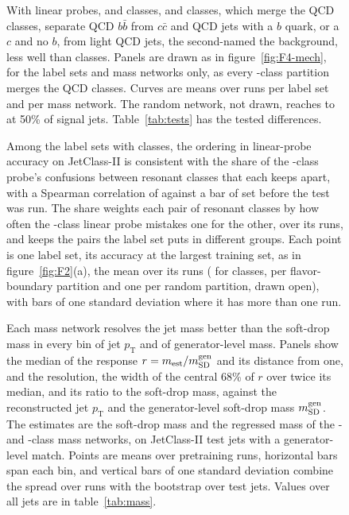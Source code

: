 \begin{figure}[tbp]
\centering
{}
\caption{With linear probes, \Kmid{} and \Kcoarse{} classes, and \Kres{} classes, which merge the QCD classes,
separate QCD $b\bar b$ from $c\bar c$ and QCD jets with a $b$ quark, or a $c$ and no $b$, from light QCD jets, the
second-named the background, less well than \Kfull{} classes. Panels are drawn as in figure~\ref{fig:F4-mech}, for
the label sets and mass networks only, as every \Kcoarse-class partition merges the QCD classes. Curves are means
over \MlstNRunsWord{} runs per label set and \MlstMassNRunsWord{} per mass network. The random network, not drawn,
reaches \MlstPairInitRhalfQcdMin{} to \MlstPairInitRhalfQcdMax{} at 50\% of signal jets. Table~\ref{tab:tests} has
the tested differences.}
\label{fig:F4-qcd}
\end{figure}

\begin{figure}[tbp]
\centering
{}
\caption{Among the \MlstConfShareNWord{} label sets with \Kcoarse{} classes, the ordering in linear-probe accuracy on
JetClass-II is consistent with the share of the \Kfull-class probe's confusions between resonant classes that each
keeps apart, with a Spearman correlation of \MlstConfShareRho{} against a bar of \MlstConfShareBar{} set before the
test was run. The share weights each pair of resonant classes by how often the \Kfull-class linear probe
mistakes one for the other, over its \MlstNRunsWord{} runs, and keeps the pairs the label set
puts in different groups. Each point is one label set, its accuracy at the largest training set, as in
figure~\ref{fig:F2}(a), the mean over its runs (\MlstNRunsWord{} for \Kcoarse{} classes, \MlstMassNRunsWord{}
per flavor-boundary partition and one per random partition, drawn open), with bars of one standard deviation where
it has more than one run.}
\label{fig:CONF-share}
\end{figure}

\begin{figure}[tbp]
\centering
{}
\caption{Each mass network resolves the jet mass better than the soft-drop mass in every bin of jet
$p_{\mathrm{T}}$ and of generator-level mass. Panels show the median of the response $r =
m_{\mathrm{est}}/m^{\mathrm{gen}}_{\mathrm{SD}}$ and its distance from one, and the resolution, the width of the central 68\% of $r$
over twice its median, and its ratio to the soft-drop mass, against the reconstructed jet $p_{\mathrm{T}}$ and the
generator-level soft-drop mass $m^{\mathrm{gen}}_{\mathrm{SD}}$. The estimates are the soft-drop mass and the regressed mass of the \Kres-
and \Kcoarse-class mass networks, on JetClass-II test jets with a generator-level match. Points are means over
\MlstMassNRunsWord{} pretraining runs, horizontal bars span each bin, and vertical bars of one standard deviation
combine the spread over runs with the bootstrap over test jets. Values over all jets are in table~\ref{tab:mass}.}
\label{fig:F9b}
\end{figure}


